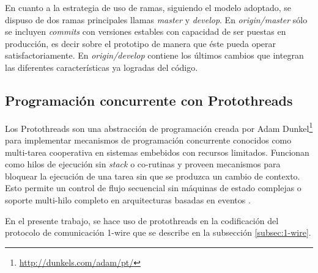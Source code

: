 En cuanto a la estrategia de uso de ramas, siguiendo el modelo adoptado, se dispuso de dos ramas principales llamas \textit{master} y \textit{develop}.  En \textit{origin/master} sólo se incluyen \textit{commits} con versiones estables con capacidad de ser puestas en producción, es decir sobre el prototipo de manera que éste pueda operar satisfactoriamente.  En \textit{origin/develop} contiene los últimos cambios que integran las diferentes características ya logradas del código.

\subsection{Programación concurrente con Protothreads} 
\label{subsec:protothreads}

Los Protothreads son una abstracción de programación creada por Adam Dunkel\footnote{\url{http://dunkels.com/adam/pt/}} para implementar mecanismos de programación concurrente conocidos como multi-tarea cooperativa en sistemas embebidos con recursos limitados. Funcionan como hilos de ejecución sin \textit{stack} o co-rutinas y proveen mecanismos para bloquear la ejecución de una tarea sin que se produzca un cambio de contexto.  Esto permite un control de flujo secuencial sin máquinas de estado complejas o soporte multi-hilo completo en arquitecturas basadas en eventos \citep{dunkels06protothreads} \citep{dunkels05using}. 

En el presente trabajo, se hace uso de protothreads en la codificación del protocolo de comunicación 1-wire que se describe en la subsección \ref{subsec:1-wire}.